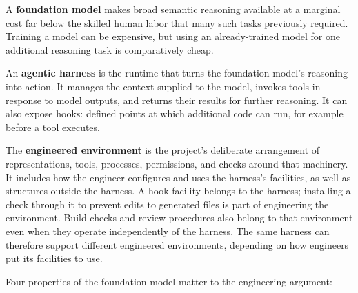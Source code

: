 


A \textbf{foundation model} makes broad semantic reasoning available at a marginal cost far below the skilled human labor that many such tasks previously required. Training a model can be expensive, but using an already-trained model for one additional reasoning task is comparatively cheap.


An \textbf{agentic harness} is the runtime that turns the foundation model’s reasoning into action. It manages the context supplied to the model, invokes tools in response to model outputs, and returns their results for further reasoning. It can also expose hooks: defined points at which additional code can run, for example before a tool executes.


The \textbf{engineered environment} is the project’s deliberate arrangement of representations, tools, processes, permissions, and checks around that machinery. It includes how the engineer configures and uses the harness’s facilities, as well as structures outside the harness. A hook facility belongs to the harness; installing a check through it to prevent edits to generated files is part of engineering the environment. Build checks and review procedures also belong to that environment even when they operate independently of the harness. The same harness can therefore support different engineered environments, depending on how engineers put its facilities to use.


Four properties of the foundation model matter to the engineering argument:

